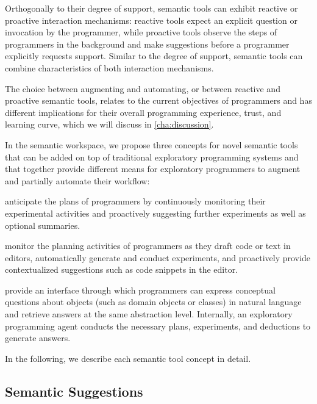 Orthogonally to their degree of support, semantic tools can exhibit reactive or proactive interaction mechanisms:
reactive tools expect an explicit question or invocation by the programmer, while proactive tools observe the steps of programmers in the background and make suggestions before a programmer explicitly requests support.
Similar to the degree of support, semantic tools can combine characteristics of both interaction mechanisms.

The choice between augmenting and automating, or between reactive and proactive semantic tools, relates to the current objectives of programmers and has different implications for their overall programming experience, trust, and learning curve, which we will discuss in \cref{cha:discussion}.

In the semantic workspace, we propose three concepts for novel semantic tools that can be added on top of traditional exploratory programming systems and that together provide different means for exploratory programmers to augment and partially automate their workflow:

\begin{description}[noextralabelsep]
	\item[Semantic suggestions] anticipate the plans of programmers by continuously monitoring their experimental activities and proactively suggesting further experiments as well as optional summaries.
	\item[Semantic completions] monitor the planning activities of programmers as they draft code or text in editors, automatically generate and conduct experiments, and proactively provide contextualized suggestions such as code snippets in the editor.
	\item[Semantic conversations] provide an interface through which programmers can express conceptual questions about objects (such as domain objects or classes) in natural language and retrieve answers at the same abstraction level.
	Internally, an exploratory programming agent conducts the necessary plans, experiments, and deductions to generate answers.
\end{description}
In the following, we describe each semantic tool concept in detail.

\subsection{Semantic Suggestions}
\label{sec:approach/workspace/suggestions}

